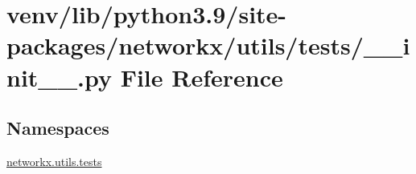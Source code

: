 \hypertarget{venv_2lib_2python3_89_2site-packages_2networkx_2utils_2tests_2____init_____8py}{}\section{venv/lib/python3.9/site-\/packages/networkx/utils/tests/\+\_\+\+\_\+init\+\_\+\+\_\+.py File Reference}
\label{venv_2lib_2python3_89_2site-packages_2networkx_2utils_2tests_2____init_____8py}
\subsection*{Namespaces}
\begin{DoxyCompactItemize}
\item 
 \hyperlink{namespacenetworkx_1_1utils_1_1tests}{networkx.\+utils.\+tests}
\end{DoxyCompactItemize}
